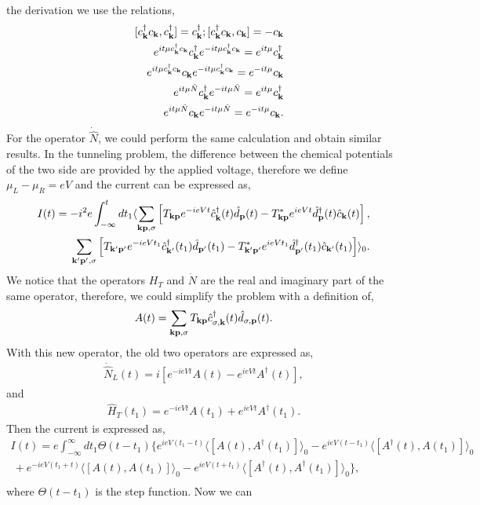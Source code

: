 \documentclass[11pt]{article}
\begin{document}
the derivation we use the relations, \begin{eqnarray}
&&[c^{\dagger}_{{\bf k}}c_{{\bf k}},c^{\dagger}_{{\bf
k}}]=c^{\dagger}_{{\bf k}};[c^{\dagger}_{{\bf k}}c_{{\bf k}},c_{{\bf
k}}]=-c_{{\bf k}}
\\\nonumber
&&e^{it \mu c^{\dagger}_{{\bf k}}c_{{\bf k}}}c^{\dagger}_{{\bf
k}}e^{-it \mu c^{\dagger}_{{\bf k}}c_{{\bf k}}}=e^{it
\mu}c^{\dagger}_{{\bf k}}
\\\nonumber
 && e^{it \mu c^{\dagger}_{{\bf k}}c_{{\bf
k}}}c_{{\bf k}}e^{-it \mu c^{\dagger}_{{\bf k}}c_{{\bf k}}}=e^{-it
\mu}c_{{\bf k}}
\\\nonumber
&& e^{it \mu {\hat N}}c^{\dagger}_{{\bf k}}e^{-it \mu {\hat N}}=e^{it
\mu}c^{\dagger}_{{\bf k}}
\\\nonumber
&& e^{it \mu {\hat N}}c_{{\bf k}}e^{-it \mu {\hat N}}=e^{-it
\mu}c_{{\bf k}}.
\end{eqnarray} For the operator \(\dot {\hat N}\), we could perform the
same calculation and obtain similar results. In the tunneling problem,
the difference between the chemical potentials of the two side are
provided by the applied voltage, therefore we define \(\mu_L-\mu_R=eV\)
and the current can be expressed as, \begin{eqnarray}
I(t)=- i^2 e \int_{-\infty}^{t} dt_1  \langle \sum_{{\bf {\bf k}}{\bf {\bf
p}},\sigma} \left[T_{{\bf k}{\bf p}}e^{-ieVt} \hat c^{\dagger}_{{\bf k}} (t)
\hat d_{{\bf p}}(t)-T^{*}_{{\bf k}{\bf p}} e^{ieVt} \hat d^{\dagger}_{{\bf p}}(t) \hat c_{{\bf k}}(t)\right],\\\
\sum_{{\bf {\bf k}'}{\bf {\bf p}'},\sigma} \left[T_{{\bf k}'{\bf
p}'}e^{-ieVt_1} \hat c^{\dagger}_{{\bf k}'} (t_1) \hat d_{{\bf
p}'}(t_1)-T^{*}_{{\bf k}'{\bf p}'} e^{ieVt_1} \hat d^{\dagger}_{{\bf
p}'}(t_1) \hat c_{{\bf k}'}(t_1)\right]  \rangle_0.\nonumber
\end{eqnarray} We notice that the operators \(H_T\) and \(\dot N\) are
the real and imaginary part of the same operator, therefore, we could
simplify the problem with a definition of, \begin{eqnarray}
A(t)= \sum_{\bf k p,\sigma} T_{\bf k p} \hat c_{\sigma,\bf
k}^{\dagger}(t) \hat d_{\sigma,\bf p}(t).
\end{eqnarray} With this new operator, the old two operators are
expressed as, \begin{eqnarray}
\dot{\hat N}_L(t)=i[e^{-ieVt}A(t)-e^{ieVt}A^{\dagger}(t)],
\end{eqnarray} and \begin{eqnarray}
\hat H_T(t_1)=e^{-ieVt}A(t_1)+e^{ieVt}A^{\dagger}(t_1).
\end{eqnarray} Then the current is expressed as, \begin{eqnarray}
I(t)=e \int_{-\infty}^{\infty} dt_1 \Theta(t-t_1)
\{e^{ieV(t_1-t)} \langle  [A(t),A^{\dagger}(t_1)] \rangle_0 -e^{ieV(t-t_1)} \langle  [A^{\dagger}(t),A(t_1)] \rangle_0 \nonumber \\\
+
e^{-ieV(t_1+t)} \langle  [A(t),A(t_1)] \rangle_0 -e^{ieV(t+t_1)} \langle  [A^{\dagger}(t),A^{\dagger}(t_1)] \rangle_0 \}, \nonumber 
\\
\end{eqnarray} where \(\Theta(t-t_1)\) is the step function. Now we can
\end{document}
